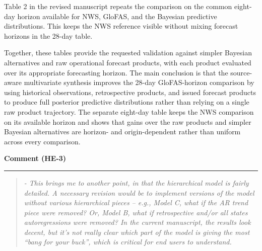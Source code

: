 \documentclass[11pt,letterpaper]{article}
\newcommand{\commentheading}[1]{%
  \vspace{6pt}\noindent\textbf{Comment (#1)}\par
  \vspace{2pt}\hrule\vspace{6pt}
}
\newenvironment{commentblock}{\begin{quote}\small\itshape}{\end{quote}}
\newenvironment{responsebox}{\begin{mdframed}[style=plainbox]}{\end{mdframed}}
\newcommand{\HE}[1]{HE-#1}
\begin{document}
\begin{responsebox}
\noindent Table 2 in the revised manuscript repeats the comparison on the common eight-day horizon available for NWS, GloFAS, and the Bayesian predictive distributions. This keeps the NWS reference visible without mixing forecast horizons in the 28-day table.\par
\medskip

Together, these tables provide the requested validation against simpler Bayesian alternatives and raw operational forecast products, with each product evaluated over its appropriate forecasting horizon. The main conclusion is that the source-aware multivariate synthesis improves the 28-day GloFAS-horizon comparison by using historical observations, retrospective products, and issued forecast products to produce full posterior predictive distributions rather than relying on a single raw product trajectory. The separate eight-day table keeps the NWS comparison on its available horizon and shows that gains over the raw products and simpler Bayesian alternatives are horizon- and origin-dependent rather than uniform across every comparison.
\end{responsebox}

\commentheading{\HE{3}}
\begin{commentblock}
- This brings me to another point, in that the hierarchical model is fairly detailed. A necessary revision would be to implement versions of the model without various hierarchical pieces -- e.g., Model C, what if the AR trend piece were removed? Or, Model B, what if retrospective and/or all states autoregressions were removed? In the current manuscript, the results look decent, but it’s not really clear which part of the model is giving the most “bang for your buck”, which is critical for end users to understand.
\end{commentblock}
\end{document}
